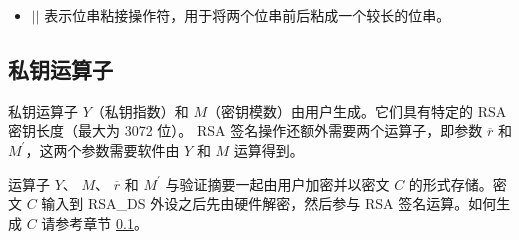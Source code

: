 \documentclass[main\_\_CN.tex]{subfiles}
\begin{document}
\begin{itemize}
    \item 
        \begin{math}{ || }\end{math}  \hspace{1.0cm}        表示位串粘接操作符，用于将两个位串前后粘成一个较长的位串。
\end{itemize}



\subsection{私钥运算子}
\label{sec:digsig-private-key-operands}

私钥运算子 \begin{math}Y\end{math}（私钥指数）和 \begin{math}M\end{math}（密钥模数）由用户生成。它们具有特定的 RSA 密钥长度（最大为 3072 位）。
RSA 签名操作还额外需要两个运算子，即参数 \begin{math}\overline{r}\end{math} 和 \begin{math}M^{\prime}\end{math}，这两个参数需要软件由 \begin{math}Y\end{math} 和 \begin{math}M\end{math} 运算得到。

    
运算子 \begin{math}Y\end{math}、
\begin{math}M\end{math}、
\begin{math}\overline{r}\end{math} 和
\begin{math}M^{\prime}\end{math} 与验证摘要一起由用户加密并以密文 \begin{math}C\end{math} 的形式存储。密文 \begin{math}C\end{math} 输入到 RSA\_DS 外设之后先由硬件解密，然后参与 RSA 签名运算。如何生成 \begin{math}C\end{math} 请参考章节 \ref{sec:digsig-private-key-operands}。
\end{document}
